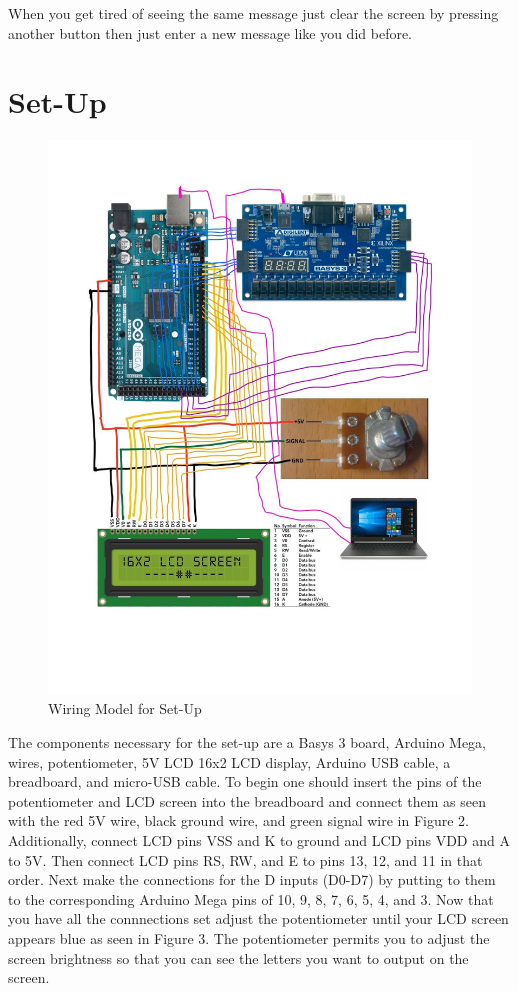 \documentclass{article}
\begin{document}
When you get tired of seeing the same message just clear the screen by pressing another button then just enter a new message
like you did before.


\section{Set-Up}
\begin{figure} [ht!]
\centering
\includegraphics[width=0.9\linewidth]{WireModel.jpg}
  \caption{Wiring Model for Set-Up}
  \label{fig:fig2}
\end{figure}


The components necessary for the set-up are a Basys 3 board, Arduino Mega, wires, potentiometer, 5V LCD 16x2 LCD display, Arduino
USB cable, a breadboard, and micro-USB cable. To begin one should insert the pins of the potentiometer and LCD screen into the 
breadboard and connect them as seen with the red 5V wire,
black ground wire, and green signal wire in Figure 2. Additionally,
connect LCD pins VSS and K to ground and LCD pins VDD and A to 5V. Then 
connect LCD pins RS, RW, and E to pins 13, 12, and 11 in that 
order. Next make the connections for the D inputs (D0-D7) by
putting to them to the corresponding Arduino Mega pins of 10, 9, 8, 7, 6, 5,
4, and 3. Now that you have all the connnections set adjust the potentiometer until your LCD screen appears blue as seen in 
Figure 3. The potentiometer permits you to adjust the screen brightness so that you can see the letters you 
want to output on the screen.
\end{document}

